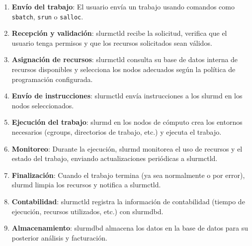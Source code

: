 \documentclass[12pt,a4paper]{article}
\begin{document}
\begin{enumerate}[leftmargin=*]
    \item \textbf{Envío del trabajo}: El usuario envía un trabajo usando comandos como \texttt{sbatch}, \texttt{srun} o \texttt{salloc}.
    
    \item \textbf{Recepción y validación}: slurmctld recibe la solicitud, verifica que el usuario tenga permisos y que los recursos solicitados sean válidos.
    
    \item \textbf{Asignación de recursos}: slurmctld consulta su base de datos interna de recursos disponibles y selecciona los nodos adecuados según la política de programación configurada.
    
    \item \textbf{Envío de instrucciones}: slurmctld envía instrucciones a los slurmd en los nodos seleccionados.
    
    \item \textbf{Ejecución del trabajo}: slurmd en los nodos de cómputo crea los entornos necesarios (cgroups, directorios de trabajo, etc.) y ejecuta el trabajo.
    
    \item \textbf{Monitoreo}: Durante la ejecución, slurmd monitorea el uso de recursos y el estado del trabajo, enviando actualizaciones periódicas a slurmctld.
    
    \item \textbf{Finalización}: Cuando el trabajo termina (ya sea normalmente o por error), slurmd limpia los recursos y notifica a slurmctld.
    
    \item \textbf{Contabilidad}: slurmctld registra la información de contabilidad (tiempo de ejecución, recursos utilizados, etc.) con slurmdbd.
    
    \item \textbf{Almacenamiento}: slurmdbd almacena los datos en la base de datos para su posterior análisis y facturación.
\end{enumerate}
\end{document}
